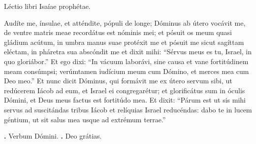 
Léctio libri Isaíae prophétae.

Audíte me, ínsulae, et atténdite, pópuli de longe; Dóminus ab útero vocávit me, de ventre matris meae recordátus est nóminis mei; et pósuit os meum quasi gládium acútum, in umbra manus suae protéxit me et pósuit me sicut sagíttam eléctam, in pháretra sua abscóndit me et dixit mihi: “Sérvus meus es tu, Israel, in quo gloriábor.” Et ego dixi: “In vácuum laborávi, sine causa et vane fortitúdinem meam consúmpsi; verúmtamen iudícium meum cum Dómino, et merces mea cum Deo meo.” Et nunc dicit Dóminus, qui formávit me ex útero servum sibi, ut redúcerem Iácob ad eum, et Israel ei congregarétur; et glorificátus sum in óculis Dómini, et Deus meus factus est fortitúdo mea. Et dixit: “Párum est ut sis mihi servus ad suscitándas tribus Iácob et relíquias Israel reducéndas: dabo te in lucem géntium, ut sit salus mea usque ad extrémum terrae.”

\textbf{\Vbar.} Verbum Dómini.
\textbf{\Rbar.} Deo grátias.
\par